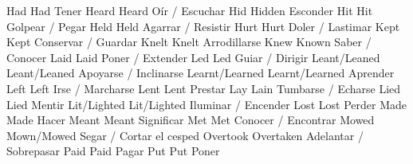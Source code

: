	            {Had}{}	                {Had}{}                 {Tener}{}
	            {Heard}{}	            {Heard}{}               {Oír / Escuchar}{}
	            {Hid}{}	                {Hidden}{}              {Esconder}{}
	            {Hit}{}	                {Hit}{}                 {Golpear / Pegar}{}
	            {Held}{}	            {Held}{}                {Agarrar / Resistir}{}
	            {Hurt}{}	            {Hurt}{}                {Doler / Lastimar}{}
	            {Kept}{}	            {Kept}{}                {Conservar / Guardar}{}
	            {Knelt}{}	            {Knelt}{}               {Arrodillarse}{}
	            {Knew}{}	            {Known}{}               {Saber / Conocer}{}
	            {Laid}{}	            {Laid}{}                {Poner / Extender}{}
	            {Led}{}	                {Led}{}                 {Guiar / Dirigir}{}
	            {Leant/Leaned}{}	    {Leant/Leaned}{}        {Apoyarse / Inclinarse}{}
	            {Learnt/Learned}{}	    {Learnt/Learned}{}      {Aprender}{}
	            {Left}{}	            {Left}{}                {Irse / Marcharse}{}
	            {Lent}{}	            {Lent}{}                {Prestar}{}
	            {Lay}{}	                {Lain}{}                {Tumbarse / Echarse}{}
	            {Lied}{}	            {Lied}{}                {Mentir}{}
	            {Lit/Lighted}{}	        {Lit/Lighted}{}         {Iluminar / Encender}{}
	            {Lost}{}	            {Lost}{}                {Perder}{}
	            {Made}{}	            {Made}{}                {Hacer}{}
	            {Meant}{}	            {Meant}{}               {Significar}{}
	            {Met}{}	                {Met}{}                 {Conocer / Encontrar}{}
	            {Mowed}{}	            {Mown/Mowed}{}          {Segar / Cortar el cesped}{}
	        {Overtook}{}	        {Overtaken}{}           {Adelantar / Sobrepasar}{}
	            {Paid}{}	            {Paid}{}                {Pagar}{}
	            {Put}{}	                {Put}{}                 {Poner}{}
